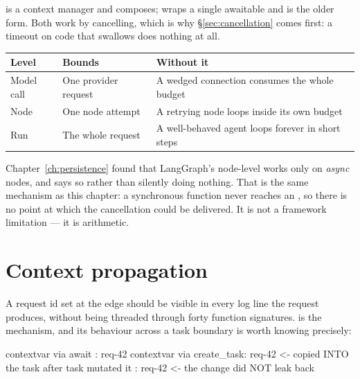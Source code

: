  is a context manager and composes;  wraps
a single awaitable and is the older form. Both work by cancelling, which is why
\S\ref{sec:cancellation} comes first: a timeout on code that swallows
 does nothing at all.


\begin{center}
\small
\begin{tabularx}{\linewidth}{@{}lXX@{}}
\toprule
\textbf{Level} & \textbf{Bounds} & \textbf{Without it} \\
\midrule
Model call & One provider request & A wedged connection consumes the whole
  budget \\[3pt]
Node & One node attempt & A retrying node loops inside its own budget \\[3pt]
Run & The whole request & A well-behaved agent loops forever in short steps \\
\bottomrule
\end{tabularx}
\end{center}

\begin{warning}
Chapter~\ref{ch:persistence} found that LangGraph's node-level 
works only on \emph{async} nodes, and says so rather than silently doing nothing.
That is the same mechanism as this chapter: a synchronous function never reaches
an , so there is no point at which the cancellation could be
delivered. It is not a framework limitation --- it is arithmetic.
\end{warning}

\section{Context propagation}
\label{sec:contextvars}

A request id set at the edge should be visible in every log line the request
produces, without being threaded through forty function signatures.
 is the mechanism, and its behaviour across a task boundary is
worth knowing precisely:

\begin{console}
contextvar via await      : req-42
contextvar via create_task: req-42       <- copied INTO the task
after task mutated it     : req-42       <- the change did NOT leak back
\end{console}

